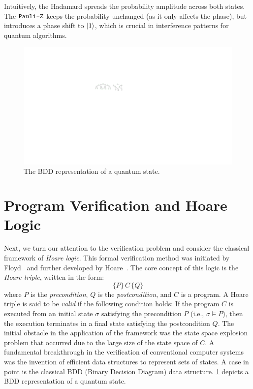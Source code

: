 Intuitively, the Hadamard spreads the probability amplitude across both states.
%
The $\texttt{Pauli-Z}$ keeps the probability unchanged (as it only affects the phase), but introduces a phase shift to $|1\rangle$, which is crucial in interference patterns for quantum algorithms.


\begin{figure}[ht] 
    \centering
    \includegraphics[scale=1.2]{Figures/BDDs/BDDs} 
    \caption{The BDD representation of a quantum state.}
    \label{BDD:fig}
\end{figure}

%

\section{Program Verification and Hoare Logic}
%
Next, we turn our attention to the verification problem and consider the classical framework of \emph{Hoare logic}.  
%
This formal verification method was initiated by  Floyd~\cite{Flo67a} and further developed by Hoare~\cite{DBLP:journals/cacm/Hoare69}.  
%
The core concept of this logic is the \emph{Hoare triple}, written in the form:
\[
\{P\}\, C\, \{Q\}
\]
where $P$ is the \emph{precondition}, $Q$ is the \emph{postcondition}, and $C$ is a program.  
%
A Hoare triple is said to be \emph{valid} if the following condition holds:
If the program $C$ is executed from an initial state $\sigma$ satisfying the precondition $P$ (i.e., $\sigma \models P$), then the execution terminates in a final state satisfying the postcondition $Q$.
%
The initial obstacle in the application of the framework was the state space explosion problem that occurred due to the large size of the state space of $C$.
%
A fundamental breakthrough in the verification of conventional computer systems was the invention of efficient data structures to represent sets of states.
A case in point is the classical BDD (Binary Decision Diagram) data structure.
%
\cref{BDD:fig} depicts a BDD representation of a quantum state.

